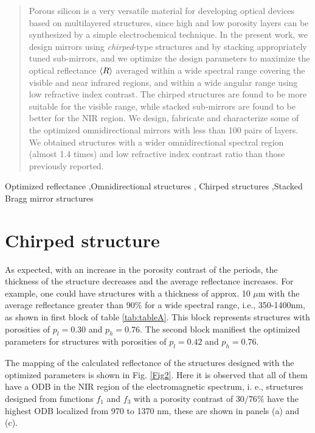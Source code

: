 \documentclass[a4paper,fleqn]{cas-sc}
\begin{document}
	\begin{abstract}
		Porous silicon is a very versatile material for developing optical
		devices based on multilayered structures, since high and low porosity layers
		can be synthesized by a simple electrochemical technique. In the present work, we design
		mirrors using \textit{chirped}-type structures and by stacking
		appropriately tuned sub-mirrors, and we optimize the design parameters
		to maximize the
		optical reflectance $\braket{R}$ averaged within a wide
		spectral range  covering the visible and near infrared regions, and
		within a wide angular range using low refractive index contrast. The chirped structures are found to be
		more suitable for the visible range,
		while stacked sub-mirrors are found to be better for the NIR
		region. We design, fabricate and characterize
		some of the optimized omnidirectional mirrors with less
		than 100 pairs of layers. We obtained structures with a wider
		omnidirectional spectral region (almost 1.4 times) and low refractive index contrast ratio than those previously
		reported.
	\end{abstract}
	
	\begin{keywords}
		Optimized reflectance \sep Omnidirectional structures \sep 
		Chirped structures \sep Stacked Bragg mirror structures
	\end{keywords}
\maketitle

\section{Chirped structure}
As expected, with an increase in the porosity contrast of the periods, the thickness 
of the structure decreases and the average reflectance increases. For 
example, one could have structures with a thickness of approx. 10 $\mu$m with the 
average reflectance greater than 90$\%$ for a wide spectral range, i.e., 350-1400nm, 
as shown in first block of table \ref{tab:tableA}. This block represents structures 
with porosities of $p_l=0.30$ and $p_h=0.76$. The second block manifiest the 
optimized parameters for structures with porosities of $p_l=0.42$ and $p_h=0.76$.

The mapping of the calculated reflectance of the structures designed with the 
optimized parameters is shown in Fig. \ref{Fig2}. Here it is observed that all of 
them have a ODB in the NIR region of the electromagnetic spectrum, i. e.,  
structures designed from functions $f_{1}$ and $f_{3}$ with a porosity contrast of 
$30/76\%$ have the highest ODB localized from 970 to 1370 nm, these are shown in 
panels (a) and (c). 	
	
\end{document}
